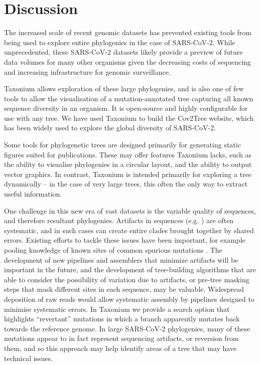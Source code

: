 \section*{Discussion}\label{s:discussion}

The increased scale of recent genomic datasets has prevented existing tools from being used to explore entire phylogenies in the case of SARS-CoV-2. While unprecedented, these SARS-CoV-2 datasets likely provide a preview of future data volumes for many other organisms given the decreasing costs of sequencing and increasing infrastructure for genomic surveillance.

Taxonium allows exploration of these large phylogenies, and is also one of few tools to allow the visualisation of a mutation-annotated tree capturing all known sequence diversity in an organism. It is open-source and highly configurable for use with any tree. We have used Taxonium to build the Cov2Tree website, which has been widely used to explore the global diversity of SARS-CoV-2.

Some tools for phylogenetic trees are designed primarily for generating static figures suited for publications. These may offer features Taxonium lacks, such as the ability to visualise phylogenies in a circular layout, and the ability to output vector graphics. In contrast, Taxonium is intended primarily for exploring a tree dynamically -- in the case of very large trees, this often the only way to extract useful information.

One challenge in this new era of vast datasets is the variable quality of sequences, and therefore resultant phylogenies. Artifacts in sequences (e.g. \citet{pmid35130474,sanderson2021variation,sanderson2021systematic}) are often systematic, and in such cases can create entire clades brought together by shared errors. Existing efforts to tackle these issues have been important, for example pooling knowledge of known sites of common spurious mutations \citep{de2020masking}. The development of new pipelines and assemblers that minimize artifacts will be important in the future, and the development of tree-building algorithms that are able to consider the possibility of variation due to artifacts, or pre-tree masking steps that mask different sites in each sequence, may be valuable. Widespread deposition of raw reads would allow systematic assembly by pipelines designed to minimise systematic errors. In Taxonium we provide a search option that highlights ``revertant'' mutations in which a branch apparently mutates back towards the reference genome. In large SARS-CoV-2 phylogenies, many of these mutations appear to in fact represent sequencing artifacts, or reversion from them, and so this approach may help identify areas of a tree that may have technical issues. 

